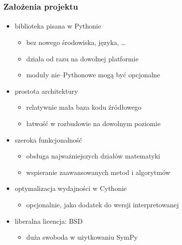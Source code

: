 \documentclass[10pt]{beamer}
\begin{document}
\begin{frame}
    \frametitle{Założenia projektu}
    \framesubtitle{}

    \begin{itemize}
        \item biblioteka pisana w Pythonie
            \begin{itemize}
                \item bez nowego środowiska, języka, \ldots
                \item działa od razu na dowolnej platformie
                \item moduły nie--Pythonowe mogą być opcjonalne
            \end{itemize}
            \pause
        \item prostota architektury
            \begin{itemize}
                \item relatywnie mała baza kodu źródłowego
                \item łatwość w rozbudowie na dowolnym poziomie
            \end{itemize}
            \pause
        \item szeroka funkcjonalność
            \begin{itemize}
                \item obsługa najważniejszych działów matematyki
                \item wspieranie zaawansowanych metod i algorytmów
            \end{itemize}
            \pause
        \item optymalizacja wydajności w Cythonie
            \begin{itemize}
                \item opcjonalnie, jako dodatek do wersji interpretowanej
            \end{itemize}
            \pause
        \item liberalna licencja: BSD
            \begin{itemize}
                \item duża swoboda w użytkowaniu SymPy
            \end{itemize}
    \end{itemize}
\end{frame}
\end{document}
